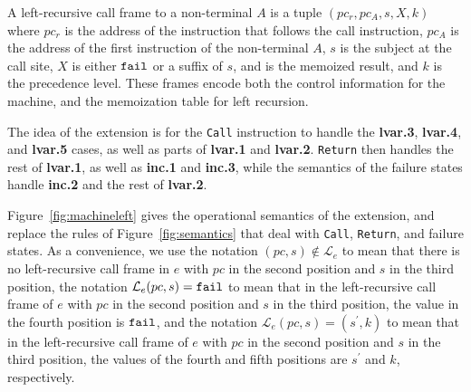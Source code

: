 A left-recursive call frame to a non-terminal $A$ is a tuple
$(pc_r,pc_A,s,X,k)$ where $pc_r$ is the address of the instruction
that follows the call instruction, $pc_A$ is the address of the first
instruction of the non-terminal $A$, $s$ is the subject at the call site,
$X$ is either $\Nothing$ or a suffix of $s$, and is the memoized
result, and $k$ is the precedence level. These frames encode both the
control information for the machine, and the memoization table for
left recursion.

The idea of the extension is for the {\tt Call} instruction to handle
the {\bf lvar.3}, {\bf lvar.4}, and {\bf lvar.5} cases, as well as
parts of {\bf lvar.1} and {\bf lvar.2}. {\tt Return} then handles the
rest of {\bf lvar.1}, as well as {\bf inc.1} and {\bf inc.3}, while
the semantics of the failure states handle {\bf inc.2} and the rest of
{\bf lvar.2}.

Figure~\ref{fig:machineleft} gives the operational semantics of the
extension, and replace the rules of Figure~\ref{fig:semantics} that
deal with {\tt Call}, {\tt Return}, and failure states. As a
convenience, we use the notation $(pc,s) \notin \mathcal{L}_e$ to mean that there is
no left-recursive call frame in $e$ with $pc$ in the second position and $s$
in the third position, the notation $\mathcal{L}_e(pc,s) = \Nothing$ to
mean that in the left-recursive call frame of $e$ with $pc$ in the second
position and $s$ in the third position, the value in the fourth
position is $\Nothing$, and the notation $\mathcal{L}_e(pc,s) =
(s^\prime,k)$ to mean that in the left-recursive call frame of $e$
with $pc$ in the second position and $s$ in the third position, the
values of the fourth and fifth positions are $s^\prime$ and $k$, respectively.

